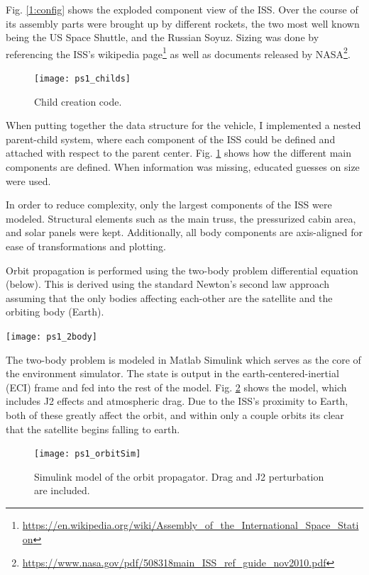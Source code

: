 \documentclass[12pt, letterpaper]{article}
\begin{document}
Fig. \ref{1:config} shows the exploded component view of the ISS. Over the course of its assembly parts were brought up by different rockets, the two most well known being the US Space Shuttle, and the Russian Soyuz. Sizing was done by referencing the ISS's wikipedia page\footnote{\url{https://en.wikipedia.org/wiki/Assembly_of_the_International_Space_Station}} as well as documents released by NASA\footnote{\url{https://www.nasa.gov/pdf/508318main_ISS_ref_guide_nov2010.pdf}}.


\begin{figure}[H]
	\centering
	\texttt{[image: ps1\_childs]}
	\caption{Child creation code.}
	\label{1:code1}
\end{figure}

When putting together the data structure for the vehicle, I implemented a nested parent-child system, where each component of the ISS could be defined and attached with respect to the parent center. Fig. \ref{1:code1} shows how the different main components are defined. When information was missing, educated guesses on size were used.

In order to reduce complexity, only the largest components of the ISS were modeled. Structural elements such as the main truss, the pressurized cabin area, and solar panels were kept. Additionally, all body components are axis-aligned for ease of transformations and plotting.

Orbit propagation is performed using the two-body problem differential equation (below). This is derived using the standard Newton's second law approach assuming that the only bodies affecting each-other are the satellite and the orbiting body (Earth).

\begin{center}\texttt{[image: ps1\_2body]}\end{center}


The two-body problem is modeled in Matlab Simulink which serves as the core of the environment simulator. The state is output in the earth-centered-inertial (ECI) frame and fed into the rest of the model. Fig. \ref{1:orbit} shows the model, which includes J2 effects and atmospheric drag. Due to the ISS's proximity to Earth, both of these greatly affect the orbit, and within only a couple orbits its clear that the satellite begins falling to earth.


\begin{figure}[H]
	\centering
	\texttt{[image: ps1\_orbitSim]}
	\caption{Simulink model of the orbit propagator. Drag and J2 perturbation are included.}
	\label{1:orbit}
\end{figure}
\end{document}
